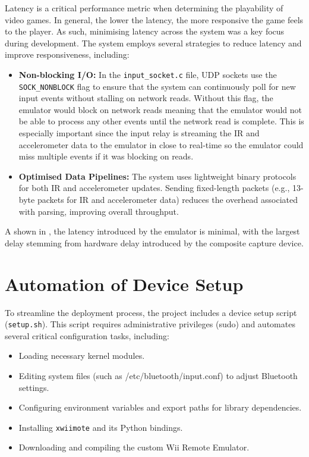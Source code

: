 Latency is a critical performance metric when determining the playability of video games. In general, the lower the latency, the more responsive the game feels to the player. As such, minimising latency across the system was a key focus during development. The system employs several strategies to reduce latency and improve responsiveness, including:

\begin{itemize}
	\item \textbf{Non-blocking I/O:} In the \texttt{input\_socket.c} file, UDP
	      sockets use the \linebreak \texttt{SOCK\_NONBLOCK} flag to ensure that the system
	      can continuously poll for new input events without stalling on network reads.
	      Without this flag, the emulator would block on network reads meaning that the
	      emulator would not be able to process any other events until the network read is
	      complete. This is especially important since the input relay is streaming the IR
	      and accelerometer data to the emulator in close to real-time so the emulator
	      could miss multiple events if it was blocking on reads.
	\item \textbf{Optimised Data Pipelines:} The system uses lightweight binary
	      protocols for both IR and accelerometer updates. Sending fixed-length packets
	      (e.g., 13-byte packets for IR and accelerometer data) reduces the overhead associated
	      with parsing, improving overall throughput.

\end{itemize}

A shown in , the latency introduced by the emulator is minimal, with the largest delay stemming from hardware delay introduced by the composite capture device.

\section{Automation of Device Setup}

To streamline the deployment process, the project includes a device setup script (\texttt{setup.sh}). This script requires administrative privileges (sudo) and automates several critical configuration tasks, including:

\begin{itemize}

	\item Loading necessary kernel modules.
	\item Editing system files (such as /etc/bluetooth/input.conf) to adjust Bluetooth settings.
	\item Configuring environment variables and export paths for library dependencies.
	\item Installing \texttt{xwiimote} and its Python bindings.
	\item Downloading and compiling the custom Wii Remote Emulator.
\end{itemize}

